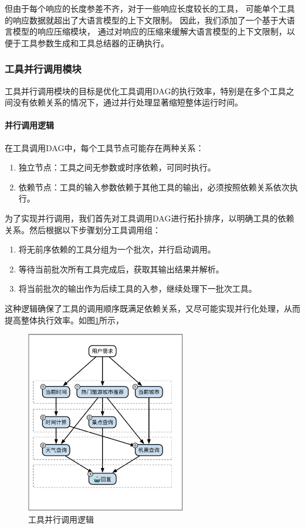 但由于每个响应的长度参差不齐，对于一些响应长度较长的工具，
可能单个工具的响应数据就超出了大语言模型的上下文限制。
因此，我们添加了一个基于大语言模型的响应压缩模块，
通过对响应的压缩来缓解大语言模型的上下文限制，以便于工具参数生成和工具总结器的正确执行。

\subsubsection{工具并行调用模块}

工具并行调用模块的目标是优化工具调用DAG的执行效率，特别是在多个工具之间没有依赖关系的情况下，通过并行处理显著缩短整体运行时间。

\paragraph{并行调用逻辑}

在工具调用DAG中，每个工具节点可能存在两种关系：
\begin{enumerate}
    \item 独立节点：工具之间无参数或时序依赖，可同时执行。
    \item 依赖节点：工具的输入参数依赖于其他工具的输出，必须按照依赖关系依次执行。
\end{enumerate}

为了实现并行调用，我们首先对工具调用DAG进行拓扑排序，以明确工具的依赖关系。然后根据以下步骤划分工具调用组：
\begin{enumerate}
    \item 将无前序依赖的工具分组为一个批次，并行启动调用。
    \item 等待当前批次所有工具完成后，获取其输出结果并解析。
    \item 将当前批次的输出作为后续工具的入参，继续处理下一批次工具。
\end{enumerate}

这种逻辑确保了工具的调用顺序既满足依赖关系，又尽可能实现并行化处理，从而提高整体执行效率。如图\ref{fig:parallel-invocation-logic}所示，

\begin{figure}[!htp]
  \centering
  \setlength{\abovecaptionskip}{10pt}
  \includegraphics[height=8cm]{../assets/ch4-并行调用模块.pdf}
  \caption{工具并行调用逻辑}
  \label{fig:parallel-invocation-logic}
\end{figure}

